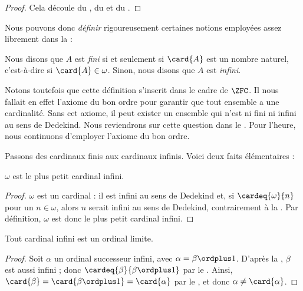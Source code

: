 \documentclass[../../../include/open-logic-section]{subfiles}
\begin{document}
\begin{proof}
Cela découle du
,
du 
et du .
\end{proof}

Nous pouvons donc \emph{définir} rigoureusement
certaines notions employées assez librement dans la
 :

\begin{defn}
Nous disons que $A$ est \emph{fini} si et seulement si
$\card{A}$ est un nombre naturel, c'est-à-dire si
$\card{A} \in \omega$. Sinon, nous disons que
$A$ est \emph{infini}.
\end{defn}
\noindent
Notons toutefois que cette définition s'inscrit
dans le cadre de $\ZFC$. Il nous fallait en effet
l'axiome du bon ordre pour garantir que tout ensemble
a une cardinalité. Sans cet axiome, il peut exister
un ensemble qui n'est ni fini ni infini au sens de
Dedekind. Nous reviendrons sur cette question dans le
. Pour l'heure, nous
continuons d'employer l'axiome du bon ordre.

Passons des cardinaux finis aux cardinaux infinis.
Voici deux faits élémentaires :

\begin{cor}
$\omega$ est le plus petit cardinal infini.
\end{cor}

\begin{proof}
$\omega$ est un cardinal : il est infini au sens
de Dedekind et, si $\cardeq{\omega}{n}$ pour
un $n \in \omega$, alors $n$ serait infini au
sens de Dedekind, contrairement à la
.
Par définition, $\omega$ est donc le plus petit
cardinal infini.
\end{proof}

\begin{cor}
Tout cardinal infini est un ordinal limite.
\end{cor}

\begin{proof}
Soit $\alpha$ un ordinal successeur infini,
avec $\alpha = \beta \ordplus 1$.
D'après la ,
$\beta$ est aussi infini ; donc
$\cardeq{\beta}{\beta \ordplus 1}$ par le
.
Ainsi,
$\card{\beta} = \card{\beta\ordplus 1}
= \card{\alpha}$ par le
,
et donc $\alpha \neq \card{\alpha}$.
\end{proof}
\end{document}
